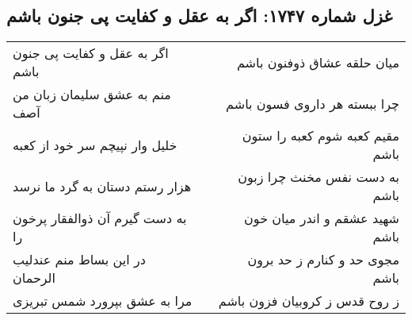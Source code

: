 \begin{center}
\section*{غزل شماره ۱۷۴۷: اگر به عقل و کفایت پی جنون باشم}
\label{sec:1747}
\begin{longtable}{l p{0.5cm} r}
اگر به عقل و کفایت پی جنون باشم
&&
میان حلقه عشاق ذوفنون باشم
\\
منم به عشق سلیمان زبان من آصف
&&
چرا ببسته هر داروی فسون باشم
\\
خلیل وار نپیچم سر خود از کعبه
&&
مقیم کعبه شوم کعبه را ستون باشم
\\
هزار رستم دستان به گرد ما نرسد
&&
به دست نفس مخنث چرا زبون باشم
\\
به دست گیرم آن ذوالفقار پرخون را
&&
شهید عشقم و اندر میان خون باشم
\\
در این بساط منم عندلیب الرحمان
&&
مجوی حد و کنارم ز حد برون باشم
\\
مرا به عشق بپرورد شمس تبریزی
&&
ز روح قدس ز کروبیان فزون باشم
\\
\end{longtable}
\end{center}
